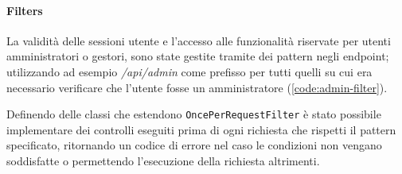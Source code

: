

\paragraph{Filters}
La validità delle sessioni utente e l'accesso alle funzionalità riservate per
utenti amministratori o gestori, sono state gestite tramite dei pattern negli
endpoint; utilizzando ad esempio \textit{/api/admin} come prefisso per tutti
quelli su cui era necessario verificare che l'utente fosse un amministratore
(\ref{code:admin-filter}).

Definendo delle classi che estendono \texttt{OncePerRequestFilter} è stato
possibile implementare dei controlli eseguiti prima di ogni richiesta che rispetti
il pattern specificato, ritornando un codice di errore nel caso le condizioni
non vengano soddisfatte o permettendo l'esecuzione della richiesta altrimenti.


